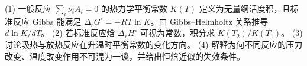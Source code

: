 (1) 一般反应 \(\sum_i\nu_iA_i=0\) 的热力学平衡常数 \(K(T)\) 定义为无量纲活度积，且标准反应 Gibbs 能满足 \(\Delta_rG^\circ=-RT\ln K\)。由 Gibbs–Helmholtz 关系推导 \(d\ln K/dT\)。
(2) 若标准反应焓 \(\Delta_rH^\circ\) 可视为常数，积分求 \(K(T_2)/K(T_1)\)。
(3) 讨论吸热与放热反应在升温时平衡常数的变化方向。
(4) 解释为何不同反应的压力改变、温度改变作用不可混为一谈，并给出恒焓近似的失效条件。
